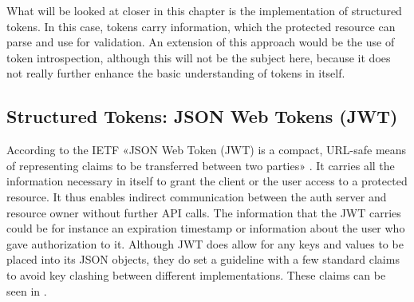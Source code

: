 What will be looked at closer in this chapter is the implementation of structured tokens. In this case, tokens carry information, which the protected resource can parse and use for validation. An extension of this approach would be the use of token introspection, although this will not be the subject here, because it does not really further enhance the basic understanding of tokens in itself.

\subsection{Structured Tokens: JSON Web Tokens (JWT)}

According to the IETF «JSON Web Token (JWT) is a compact, URL-safe means of representing claims to be transferred between two parties» \cite[p. 1]{RFC7519}. It carries all the information necessary in itself to grant the client or the user access to a protected resource. It thus enables indirect communication between the auth server and resource owner without further API calls. The information that the JWT carries could be for instance an expiration time\-stamp or information about the user who gave authorization to it. Although JWT does allow for any keys and values to be placed into its JSON objects, they do set a guideline with a few standard claims to avoid key clashing between different implementations. These claims can be seen in  \cite[p. 185]{oauth2-in-action}.

